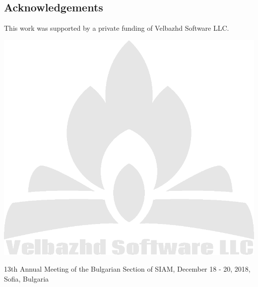 \documentclass[a0,portrait,25pt]{sciposter}
\begin{document}
\begin{multicols}{3}
\begin{mdframed}[backgroundcolor=white,roundcorner=4pt,shadow=true,linewidth=1pt]
\section*{Acknowledgements}
This work was supported by a private funding of Velbazhd Software LLC. 

\includegraphics[width=0.98\linewidth]{veld_soft_camp_fire_logo}
\end{mdframed}
\end{multicols}

\begin{mdframed}[backgroundcolor=white,roundcorner=4pt,shadow=true,linewidth=1pt]
\color{Black}
13th Annual Meeting of the Bulgarian Section of SIAM, December 18 - 20, 2018, Sofia, Bulgaria
\end{mdframed}
\end{document}
